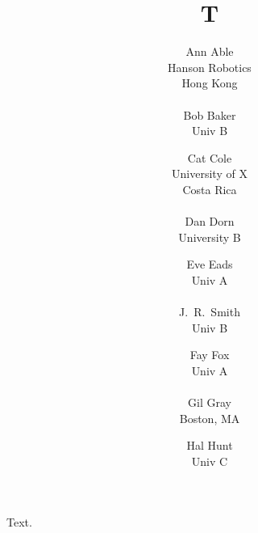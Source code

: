 \documentclass{article}
\title{T}
\author{Ann Able \\
Hanson Robotics \\
Hong Kong \\
\\
Bob Baker \\
Univ B
\and Cat Cole \\
University of X \\
Costa Rica \\
\\
Dan Dorn \\
University B
\and Eve Eads \\
Univ A \\
\\
J.~R.~Smith \\
Univ B
\and Fay Fox \\
Univ A \\
\\
Gil Gray \\
Boston, MA
\and Hal Hunt \\
Univ C}
\begin{document}
\maketitle
Text.
\end{document}
